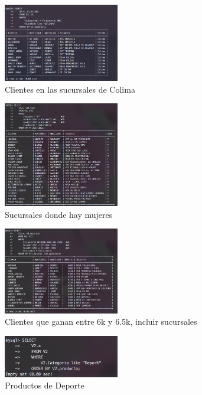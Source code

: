 \documentclass[12pt, fleqn]{article}                             %
\begin{document}
        \clearpage

        \begin{figure}[ht!]
            \centering
            \includegraphics[width=0.45\textwidth]{BD5Reporte2Parte1}
            \caption{Clientes en las sucursales de Colima}
        \end{figure}

        \begin{figure}[ht!]
            \centering
            \includegraphics[width=0.45\textwidth]{BD5Reporte2Parte2}
            \caption{Sucursales donde hay mujeres}
        \end{figure}

        \begin{figure}[ht!]
            \centering
            \includegraphics[width=0.45\textwidth]{BD5Reporte2Parte3}
            \caption{Clientes que ganan entre 6k y 6.5k, incluir sucursales}
        \end{figure}


        \begin{figure}[ht!]
            \centering
            \includegraphics[width=0.45\textwidth]{BD5Reporte2Parte4}
            \caption{Productos de Deporte}
        \end{figure}
\end{document}
